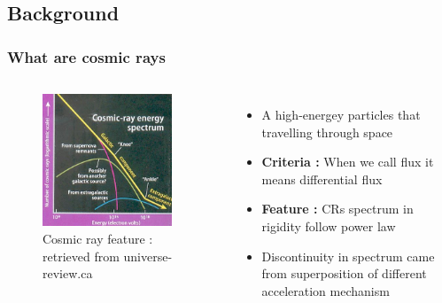 \documentclass{beamer}
\begin{document}
\subsection{Background}
\begin{frame}
\frametitle{What are cosmic rays}
  \begin{columns}

      \begin{figure}
      \includegraphics[height=0.7\textheight, width=0.9\textwidth]{CRFeature}
      \caption{Cosmic ray feature : retrieved from  universe-review.ca }
      \end{figure}

      \begin{itemize}
      \item{A high-energey particles that travelling through space}
      \\ 
      \item{\textbf{Criteria :} When we call flux it means differential flux}
      \\ 
      \item{\textbf{Feature :} CRs spectrum in rigidity follow power law }
      \item{Discontinuity in spectrum came from superposition of different acceleration mechanism}
      \end{itemize}
  \end{columns}
\end{frame}
\end{document}
